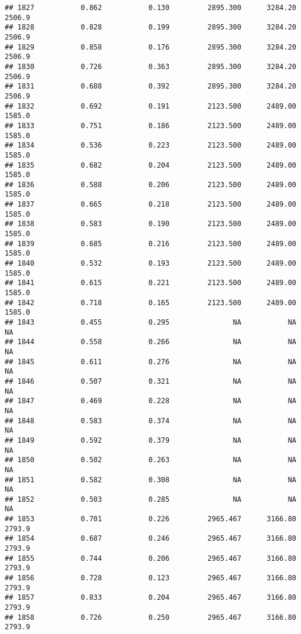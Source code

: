\documentclass[
]{article}
\begin{document}
\begin{verbatim}
## 1827           0.862           0.130         2895.300      3284.20       2506.9
## 1828           0.828           0.199         2895.300      3284.20       2506.9
## 1829           0.858           0.176         2895.300      3284.20       2506.9
## 1830           0.726           0.363         2895.300      3284.20       2506.9
## 1831           0.688           0.392         2895.300      3284.20       2506.9
## 1832           0.692           0.191         2123.500      2489.00       1585.0
## 1833           0.751           0.186         2123.500      2489.00       1585.0
## 1834           0.536           0.223         2123.500      2489.00       1585.0
## 1835           0.682           0.204         2123.500      2489.00       1585.0
## 1836           0.588           0.206         2123.500      2489.00       1585.0
## 1837           0.665           0.218         2123.500      2489.00       1585.0
## 1838           0.583           0.190         2123.500      2489.00       1585.0
## 1839           0.685           0.216         2123.500      2489.00       1585.0
## 1840           0.532           0.193         2123.500      2489.00       1585.0
## 1841           0.615           0.221         2123.500      2489.00       1585.0
## 1842           0.718           0.165         2123.500      2489.00       1585.0
## 1843           0.455           0.295               NA           NA           NA
## 1844           0.558           0.266               NA           NA           NA
## 1845           0.611           0.276               NA           NA           NA
## 1846           0.507           0.321               NA           NA           NA
## 1847           0.469           0.228               NA           NA           NA
## 1848           0.583           0.374               NA           NA           NA
## 1849           0.592           0.379               NA           NA           NA
## 1850           0.502           0.263               NA           NA           NA
## 1851           0.582           0.308               NA           NA           NA
## 1852           0.503           0.285               NA           NA           NA
## 1853           0.701           0.226         2965.467      3166.80       2793.9
## 1854           0.687           0.246         2965.467      3166.80       2793.9
## 1855           0.744           0.206         2965.467      3166.80       2793.9
## 1856           0.728           0.123         2965.467      3166.80       2793.9
## 1857           0.833           0.204         2965.467      3166.80       2793.9
## 1858           0.726           0.250         2965.467      3166.80       2793.9

\end{verbatim}
\end{document}
